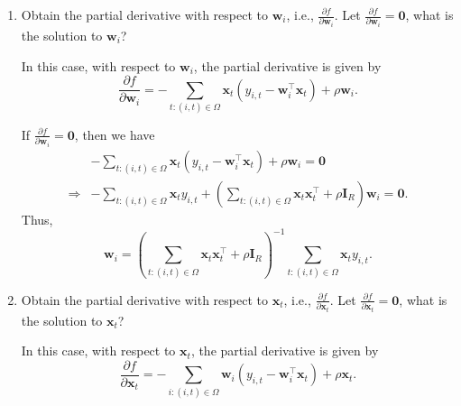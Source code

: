 \documentclass[12pt]{article}
\begin{document}
\begin{enumerate}
\item Obtain the partial derivative with respect to $\boldsymbol{w}_{i}$, i.e., $\frac{\partial f}{\partial \boldsymbol{w}_{i}}$. Let $\frac{\partial f}{\partial \boldsymbol{w}_{i}}=\boldsymbol{0}$, what is the solution to $\boldsymbol{w}_{i}$?

{\color{red}
In this case, with respect to $\boldsymbol{w}_{i}$, the partial derivative is given by
\begin{equation}
\frac{\partial f}{\partial\boldsymbol{w}_{i}}=-\sum_{t:(i,t)\in\Omega}\boldsymbol{x}_{t}\left(y_{i,t}-\boldsymbol{w}_{i}^{\top}\boldsymbol{x}_{t}\right)+\rho\boldsymbol{w}_{i}.
\end{equation}

If $\frac{\partial f}{\partial \boldsymbol{w}_{i}}=\boldsymbol{0}$, then we have
\begin{equation}
\begin{aligned}
&-\sum_{t:(i,t)\in\Omega}\boldsymbol{x}_{t}\left(y_{i,t}-\boldsymbol{w}_{i}^{\top}\boldsymbol{x}_{t}\right)+\rho\boldsymbol{w}_{i}=\boldsymbol{0} \\
\Longrightarrow&-\sum_{t:(i,t)\in\Omega}\boldsymbol{x}_{t}y_{i,t}+\left(\sum_{t:(i,t)\in\Omega}\boldsymbol{x}_{t}\boldsymbol{x}_{t}^{\top}+\rho\boldsymbol{I}_{R}\right)\boldsymbol{w}_{i}=\boldsymbol{0}.
\end{aligned}
\end{equation}
Thus,
\begin{equation}\label{solution2w}
\boldsymbol{w}_{i}=\left(\sum_{t:(i,t)\in\Omega}\boldsymbol{x}_{t}\boldsymbol{x}_{t}^{\top}+\rho\boldsymbol{I}_{R}\right)^{-1}\sum_{t:(i,t)\in\Omega}\boldsymbol{x}_{t}y_{i,t}.
\end{equation}
}

\item Obtain the partial derivative with respect to $\boldsymbol{x}_{t}$, i.e., $\frac{\partial f}{\partial \boldsymbol{x}_{t}}$. Let $\frac{\partial f}{\partial \boldsymbol{x}_{t}}=\boldsymbol{0}$, what is the solution to $\boldsymbol{x}_{t}$?

{\color{red}
In this case, with respect to $\boldsymbol{x}_{t}$, the partial derivative is given by
\begin{equation}
\frac{\partial f}{\partial\boldsymbol{x}_{t}}=-\sum_{i:(i,t)\in\Omega}\boldsymbol{w}_{i}\left(y_{i,t}-\boldsymbol{w}_{i}^{\top}\boldsymbol{x}_{t}\right)+\rho\boldsymbol{x}_{t}.
\end{equation}

}
\end{enumerate}
\end{document}
